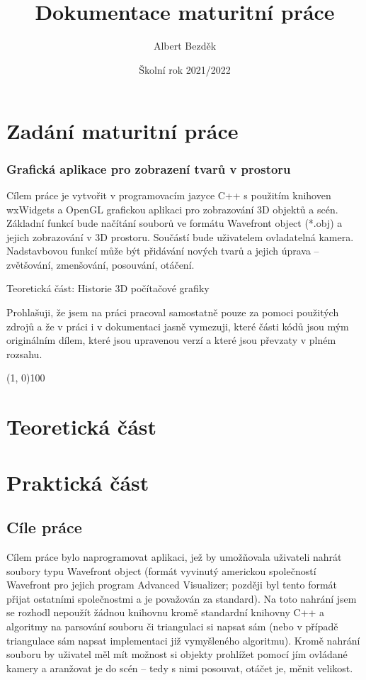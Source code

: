 \documentclass[a4paper, 12pt]{report}
\newlength{\bodyparskip}
\newlength{\tocparskip}
\begin{document}
%
\title{
    {\fontsize{65}{75}\selectfont {}} \\ [0.7cm]
    {\LARGE Dokumentace maturitní práce}
}
\author{\LARGE Albert Bezděk}
\date{Školní rok 2021/2022}
\maketitle
{}
%
\chapter*{Zadání maturitní práce}
\subsection*{Grafická aplikace pro zobrazení tvarů v prostoru}
Cílem práce je vytvořit v programovacím jazyce C++ s použitím knihoven wxWidgets a OpenGL grafickou aplikaci pro zobrazování 3D objektů a scén. Základní funkcí bude načítání souborů ve formátu Wavefront object (*.obj) a jejich zobrazování v 3D prostoru. Součástí bude uživatelem ovladatelná kamera. Nadstavbovou funkcí může být přidávání nových tvarů a jejich úprava – zvětšování, zmenšování, posouvání, otáčení.

Teoretická část: Historie 3D počítačové grafiky

\pagebreak
\hspace{0pt}
\vfill
Prohlašuji, že jsem na práci pracoval samostatně pouze za pomoci použitých zdrojů a že v práci i v dokumentaci jasně vymezuji, které části kódů jsou mým originálním dílem, které jsou upravenou verzí a které jsou převzaty v plném rozsahu.
\bigskip
\begin{flushright}
    \line(1, 0){100}
\end{flushright}
\vfill
\hspace{0pt}

\setlength{\parskip}{\tocparskip}
\tableofcontents
\setlength{\parskip}{\bodyparskip}
%
\chapter{Teoretická část}
\blindtext[1]
%
\chapter{Praktická část}
\section{Cíle práce}
Cílem práce bylo naprogramovat aplikaci, jež by umožňovala uživateli nahrát soubory typu Wavefront object (formát vyvinutý americkou společností Wavefront pro jejich program Advanced Visualizer\cite{wiki:obj}; později byl tento formát přijat ostatními společnostmi a je považován za standard). Na toto nahrání jsem se rozhodl nepoužít žádnou knihovnu kromě standardní knihovny C++ a algoritmy na parsování souboru či triangulaci si napsat sám (nebo v případě triangulace sám napsat implementaci již vymyšleného algoritmu). Kromě nahrání souboru by uživatel měl mít možnost si objekty prohlížet pomocí jím ovládané kamery a aranžovat je do scén -- tedy s nimi posouvat, otáčet je, měnit velikost.
\end{document}
